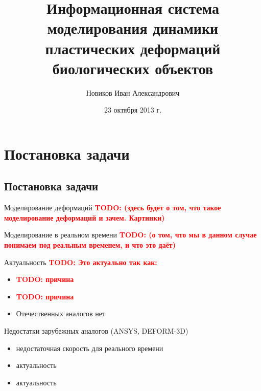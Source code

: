 \documentclass[usenames,dvipsnames,pdftex,unicode,hidelinks]{beamer}
\title[Система моделирования деформаций биологических объектов]{Информационная система моделирования динамики пластических деформаций биологических объектов}
\author[Иван Новиков]{Новиков Иван Александрович}
\institute{Кубанский Государственный Университет}
\date{ 23 октября 2013 г. }
\newcommand{\todo}[1]{\textbf{\textcolor{red}{TODO: #1}}}
\begin{document}
  
  {
    \begin{frame}[plain]
      \titlepage
    \end{frame}
  }

  \section{Постановка задачи}
  \subsection{Постановка задачи} %
  \begin{frame}{Моделирование деформаций}
    \todo{(здесь будет о том, что такое моделирование деформаций и зачем. Картинки)}
  \end{frame}
  \begin{frame}{Моделирование в реальном времени}
    \todo{(о том, что мы в данном случае понимаем под реальным временем, и что это даёт)}
  \end{frame}

  \begin{frame}{Актуальность}
    \todo{Это актуально так как:}
    \begin{itemize}
      \item \todo{причина}
      \item \todo{причина}
      \item Отечественных аналогов нет
    \end{itemize}
    
    Недостатки зарубежных аналогов (ANSYS, DEFORM-3D)
    \begin{itemize}
      \item недостаточная скорость для реального времени
      \item актуальность
      \item актуальность
    \end{itemize}
  \end{frame}
\end{document}
